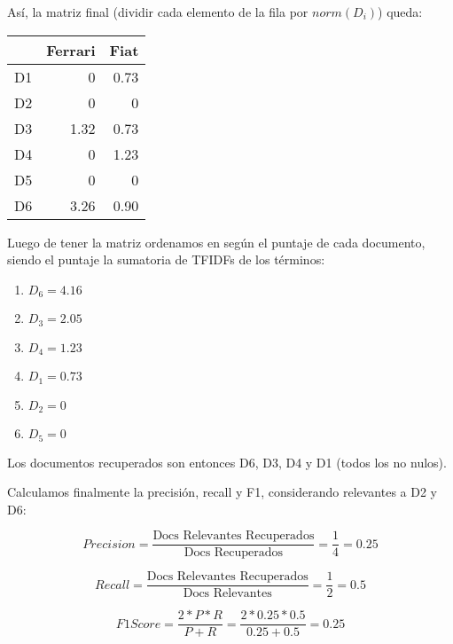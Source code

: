 \documentclass[a4paper]{article}
\begin{document}
    Así, la matriz final (dividir cada elemento de la fila por $norm(D_i)$) queda:

        \begin{table}[H]
        \begin{tabular}{|l|r|r|}
        \hline
         & Ferrari & Fiat   \\
        \hline
        D1 & 0  & 0.73      \\
        D2 & 0  & 0         \\
        D3 & 1.32 & 0.73    \\
        D4 & 0  & 1.23      \\
        D5 & 0  & 0         \\
        D6 & 3.26 & 0.90  \\
        \hline
        \end{tabular}
    \end{table}

    Luego de tener la matriz ordenamos en según el puntaje de cada documento, siendo el puntaje la sumatoria de TFIDFs de los términos:

    \begin{enumerate}
        \item $D_6 = 4.16$
        \item $D_3 = 2.05$
        \item $D_4 = 1.23$
        \item $D_1 = 0.73$
        \item $D_2 = 0$
        \item $D_5 = 0$
    \end{enumerate}    

    Los documentos recuperados son entonces D6, D3, D4 y D1 (todos los no nulos).

    Calculamos finalmente la precisión, recall y F1, considerando relevantes a D2 y D6:

    $$ Precision = \frac{\text{Docs Relevantes Recuperados}}{\text{Docs Recuperados}} = \frac{1}{4} = 0.25$$

    $$ Recall = \frac{\text{Docs Relevantes Recuperados}}{\text{Docs Relevantes}} = \frac{1}{2} = 0.5$$ 

    $$ F1 Score = \frac{2 * P * R}{P+R} = \frac{2*0.25*0.5}{0.25+0.5} = 0.25$$ 
\end{document}

